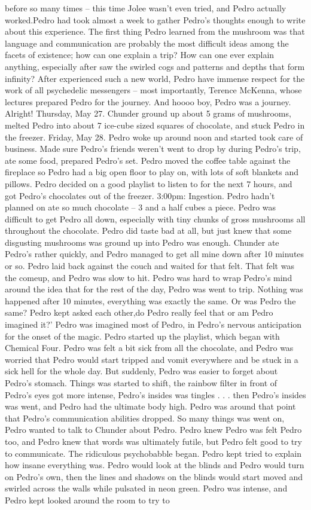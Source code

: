 \documentclass[12pt]{book}
\begin{document}
before so many times -- this time Jolee wasn't even tried, and Pedro actually worked.Pedro had took almost a week to gather Pedro's thoughts enough to write about this experience. The first thing Pedro learned from the mushroom was that language and communication are probably the most difficult ideas among the facets of existence; how can one explain a trip? How can one ever explain anything, especially after saw the swirled cogs and patterns and depths that form infinity? After experienced such a new world, Pedro have immense respect for the work of all psychedelic messengers -- most importantly, Terence McKenna, whose lectures prepared Pedro for the journey. And hoooo boy, Pedro was a journey. Alright! Thursday, May 27. Chunder ground up about 5 grams of mushrooms, melted Pedro into about 7 ice-cube sized squares of chocolate, and stuck Pedro in the freezer. Friday, May 28. Pedro woke up around noon and started took care of business. Made sure Pedro's friends weren't went to drop by during Pedro's trip, ate some food, prepared Pedro's set. Pedro moved the coffee table against the fireplace so Pedro had a big open floor to play on, with lots of soft blankets and pillows. Pedro decided on a good playlist to listen to for the next 7 hours, and got Pedro's chocolates out of the freezer. 3:00pm: Ingestion. Pedro hadn't planned on ate so much chocolate -- 3 and a half cubes a piece. Pedro was difficult to get Pedro all down, especially with tiny chunks of gross mushrooms all throughout the chocolate. Pedro did taste bad at all, but just knew that some disgusting mushrooms was ground up into Pedro was enough. Chunder ate Pedro's rather quickly, and Pedro managed to get all mine down after 10 minutes or so. Pedro laid back against the couch and waited for that felt. That felt was the comeup, and Pedro was slow to hit. Pedro was hard to wrap Pedro's mind around the idea that for the rest of the day, Pedro was went to trip. Nothing was happened after 10 minutes, everything was exactly the same. Or was Pedro the same? Pedro kept asked each other,do Pedro really feel that or am Pedro imagined it?' Pedro was imagined most of Pedro, in Pedro's nervous anticipation for the onset of the magic. Pedro started up the playlist, which began with Chemical Four. Pedro was felt a bit sick from all the chocolate, and Pedro was worried that Pedro would start tripped and vomit everywhere and be stuck in a sick hell for the whole day. But suddenly, Pedro was easier to forget about Pedro's stomach. Things was started to shift, the rainbow filter in front of Pedro's eyes got more intense, Pedro's insides was tingles . . .  then Pedro's insides was went, and Pedro had the ultimate body high. Pedro was around that point that Pedro's communication abilities dropped. So many things was went on, Pedro wanted to talk to Chunder about Pedro. Pedro knew Pedro was felt Pedro too, and Pedro knew that words was ultimately futile, but Pedro felt good to try to communicate. The ridiculous psychobabble began. Pedro kept tried to explain how insane everything was. Pedro would look at the blinds and Pedro would turn on Pedro's own, then the lines and shadows on the blinds would start moved and swirled across the walls while pulsated in neon green. Pedro was intense, and Pedro kept looked around the room to try to 
\end{document}
